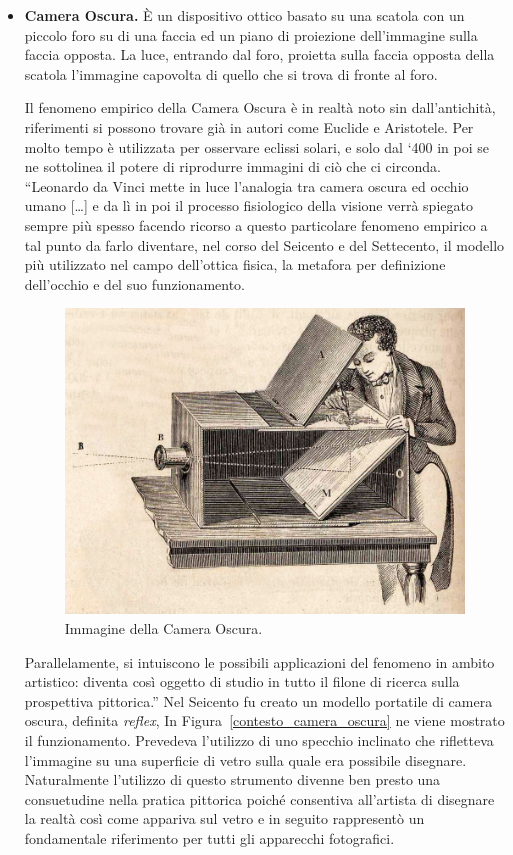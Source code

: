 \begin{itemize}
	\item \textbf{Camera Oscura.}
	\label{contesto_camera_oscura}
	È un dispositivo ottico basato su una scatola con un piccolo foro su di una faccia ed un piano di proiezione dell’immagine sulla faccia opposta. La luce, entrando dal foro, proietta sulla faccia opposta della scatola l’immagine capovolta di quello che si trova di fronte al foro.
	
	Il fenomeno empirico della Camera Oscura è in realtà noto sin dall’antichità, riferimenti si possono trovare già in autori come Euclide e Aristotele.
	Per molto tempo è utilizzata per osservare eclissi solari, e solo dal ‘400 in poi se ne sottolinea il potere di riprodurre immagini di ciò che ci circonda. “Leonardo da Vinci mette in luce l’analogia tra camera oscura ed occhio umano […] e da lì in poi il processo fisiologico della visione verrà spiegato sempre più spesso facendo ricorso a questo particolare fenomeno empirico a tal punto da farlo diventare, nel corso del Seicento e del Settecento, il modello più utilizzato nel campo dell’ottica fisica, la metafora per definizione dell’occhio e del suo funzionamento.
	
	\begin{figure}%
		\centering
		\includegraphics[width= 0.7\columnwidth]{images/contestoRiferimento/01_cameraOscura.jpg}
		\caption{Immagine della Camera Oscura.}
		\label{fig:contesto_riferimento_camera_oscura}
	\end{figure}
	
	Parallelamente, si intuiscono le possibili applicazioni del fenomeno in ambito artistico: diventa così oggetto di studio in tutto il filone di ricerca sulla prospettiva pittorica.”
	Nel Seicento fu creato un modello portatile di camera oscura, definita \textit{reflex}, In Figura~\ref{contesto_camera_oscura} ne viene mostrato il funzionamento. Prevedeva l’utilizzo di uno specchio inclinato che rifletteva l’immagine su una superficie di vetro sulla quale era possibile disegnare. Naturalmente l’utilizzo di questo strumento divenne ben presto una consuetudine nella pratica pittorica poiché consentiva all’artista di disegnare la realtà così come appariva sul vetro e in seguito rappresentò un fondamentale riferimento per tutti gli apparecchi fotografici.
	

\end{itemize}
